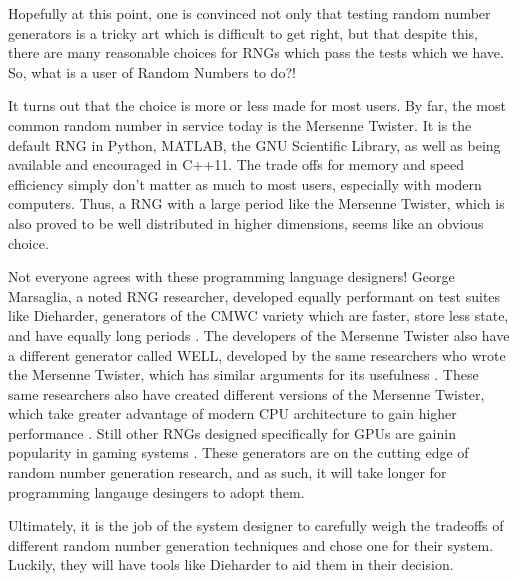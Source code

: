 Hopefully at this point, one is convinced not only that testing random number generators is a tricky art which is difficult to get right, but that despite this, there are many reasonable choices for RNGs which pass the tests which we have. So, what is a user of Random Numbers to do?!

It turns out that the choice is more or less made for most users. By far, the most common random number in service today is the Mersenne Twister. It is the default RNG in Python, MATLAB, the GNU Scientific Library, as well as being available and encouraged in C++11. The trade offs for memory and speed efficiency simply don't matter as much to most users, especially with modern computers. Thus, a RNG with a large period like the Mersenne Twister, which is also proved to be well distributed in higher dimensions, seems like an obvious choice.

Not everyone agrees with these programming language designers! George Marsaglia, a noted RNG researcher, developed equally performant on test suites like Dieharder, generators of the CMWC variety which are faster, store less state, and have equally long periods \cite{Marsaglia:2003:SRN:769800.769827}. The developers of the Mersenne Twister also have a different generator called WELL, developed by the same researchers who wrote the Mersenne Twister, which has similar arguments for its usefulness \cite{Panneton:2006:ILG:1132973.1132974}. These same researchers also have created different versions of the Mersenne Twister, which take greater advantage of modern CPU architecture to gain higher performance \cite{sfmt,tinymt}. Still other RNGs designed specifically for GPUs are gainin popularity in gaming systems \cite{Passerat-Palmbach:2011:PNG:2060104.2060643,Zafar:2010:GRN:1921479.1921500}. These generators are on the cutting edge of random number generation research, and as such, it will take longer for programming langauge desingers to adopt them.

Ultimately, it is the job of the system designer to carefully weigh the tradeoffs of different random number generation techniques and chose one for their system. Luckily, they will have tools like Dieharder to aid them in their decision.
